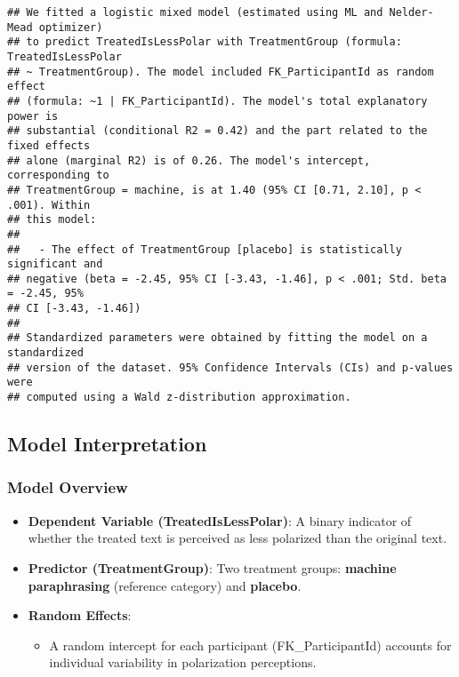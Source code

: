 \documentclass[
]{article}
\providecommand{\tightlist}{%
  \setlength{\itemsep}{0pt}\setlength{\parskip}{0pt}}
\begin{document}
\begin{verbatim}
## We fitted a logistic mixed model (estimated using ML and Nelder-Mead optimizer)
## to predict TreatedIsLessPolar with TreatmentGroup (formula: TreatedIsLessPolar
## ~ TreatmentGroup). The model included FK_ParticipantId as random effect
## (formula: ~1 | FK_ParticipantId). The model's total explanatory power is
## substantial (conditional R2 = 0.42) and the part related to the fixed effects
## alone (marginal R2) is of 0.26. The model's intercept, corresponding to
## TreatmentGroup = machine, is at 1.40 (95% CI [0.71, 2.10], p < .001). Within
## this model:
## 
##   - The effect of TreatmentGroup [placebo] is statistically significant and
## negative (beta = -2.45, 95% CI [-3.43, -1.46], p < .001; Std. beta = -2.45, 95%
## CI [-3.43, -1.46])
## 
## Standardized parameters were obtained by fitting the model on a standardized
## version of the dataset. 95% Confidence Intervals (CIs) and p-values were
## computed using a Wald z-distribution approximation.
\end{verbatim}

\subsection{\texorpdfstring{\textbf{Model
Interpretation}}{Model Interpretation}}\label{model-interpretation-1}

\subsubsection{\texorpdfstring{\textbf{Model
Overview}}{Model Overview}}\label{model-overview-1}

\begin{itemize}
\tightlist
\item
  \textbf{Dependent Variable (TreatedIsLessPolar)}: A binary indicator
  of whether the treated text is perceived as less polarized than the
  original text.
\item
  \textbf{Predictor (TreatmentGroup)}: Two treatment groups:
  \textbf{machine paraphrasing} (reference category) and
  \textbf{placebo}.
\item
  \textbf{Random Effects}:

  \begin{itemize}
  \tightlist
  \item
    A random intercept for each participant (FK\_ParticipantId) accounts
    for individual variability in polarization perceptions.
  \end{itemize}
\end{itemize}
\end{document}
